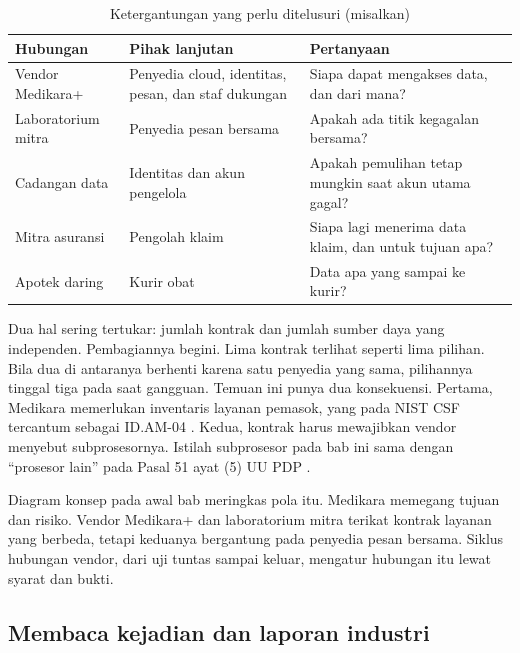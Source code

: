\begin{table}[!htb]
  \centering\small
  \caption{Ketergantungan yang perlu ditelusuri (misalkan)}\label{tab:ch09-rantai}
  \begin{tabularx}{\textwidth}{|>{\raggedright\arraybackslash}X|>{\raggedright\arraybackslash}X|>{\raggedright\arraybackslash}X|}
    \hline
    \textbf{Hubungan} & \textbf{Pihak lanjutan} & \textbf{Pertanyaan} \\ \hline
    Vendor Medikara+ & Penyedia cloud, identitas, pesan, dan staf dukungan & Siapa dapat mengakses
    data, dan dari mana? \\ \hline
    Laboratorium mitra & Penyedia pesan bersama & Apakah ada titik kegagalan bersama? \\ \hline
    Cadangan data & Identitas dan akun pengelola & Apakah pemulihan tetap mungkin saat akun utama
    gagal? \\ \hline
    Mitra asuransi & Pengolah klaim & Siapa lagi menerima data klaim, dan untuk tujuan apa? \\
    \hline
    Apotek daring & Kurir obat & Data apa yang sampai ke kurir? \\ \hline
  \end{tabularx}
\end{table}

Dua hal sering tertukar: jumlah kontrak dan jumlah sumber daya yang independen. Pembagiannya
begini. Lima kontrak terlihat seperti lima pilihan. Bila dua di antaranya berhenti karena satu
penyedia yang sama, pilihannya tinggal tiga pada saat gangguan. Temuan ini punya dua konsekuensi.
Pertama, Medikara memerlukan inventaris layanan pemasok, yang pada NIST CSF tercantum sebagai
ID.AM-04 \cite{nistcsf2}. Kedua, kontrak harus mewajibkan vendor menyebut subprosesornya. Istilah
subprosesor pada bab ini sama dengan ``prosesor lain'' pada Pasal 51 ayat (5) UU PDP
\cite{uu27-2022-pdp}.

Diagram konsep pada awal bab meringkas pola itu. Medikara memegang tujuan dan risiko. Vendor
Medikara+ dan laboratorium mitra terikat kontrak layanan yang berbeda, tetapi keduanya bergantung
pada penyedia pesan bersama. Siklus hubungan vendor, dari uji tuntas sampai keluar, mengatur
hubungan itu lewat syarat dan bukti.

\subsection*{Membaca kejadian dan laporan industri}

